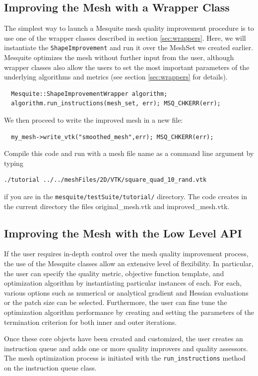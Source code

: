 \documentclass[letter]{report}
\begin{document}
\subsection{Improving the Mesh with a Wrapper Class}
\label{sec:tutWrapper}
The simplest way to launch a Mesquite mesh quality improvement procedure is to use one of the
wrapper classes described in section \ref{sec:wrappers}. Here, we will instantiate the
\texttt{ShapeImprovement} and run it over the MeshSet we created earlier. Mesquite
optimizes the mesh without further input from the user, although wrapper classes also allow the
users to set the most important parameters of the underlying algorithms and metrics (see section
\ref{sec:wrappers} for details).
\begin{verbatim}
  Mesquite::ShapeImprovementWrapper algorithm;
  algorithm.run_instructions(mesh_set, err); MSQ_CHKERR(err);
\end{verbatim}
We then proceed to write the improved mesh in a new file:
\begin{verbatim}
  my_mesh->write_vtk("smoothed_mesh",err); MSQ_CHKERR(err);
\end{verbatim}
Compile this code and run with a mesh file name as a command line argument by 
typing 
\begin{verbatim}
./tutorial ../../meshFiles/2D/VTK/square_quad_10_rand.vtk
\end{verbatim}
if you are in the \texttt{mesquite/testSuite/tutorial/} directory.
The code creates in the current directory the files original\_mesh.vtk
and improved\_mesh.vtk. 

\subsection{Improving the Mesh with the Low Level API}
\label{sec:tutDetailedAPI}
If the user requires in-depth control over the mesh quality improvement
process, the use of the Mesquite classes allow an extensive
level of flexibility.   In particular, the user can specify the quality
metric, objective function template, and optimization algorithm by
instantiating particular instances of each.  For each, various options
such as numerical or analytical gradient and Hessian evaluations or
the patch size can be selected.  Furthermore, the user can fine tune
the optimization algorithm performance by creating and setting the parameters 
of the termination criterion for both inner and outer iterations.

Once these core objects have been created and customized, the user
creates an instruction queue and adds one or more quality improvers
and quality assessors.  The mesh optimization process is initiated
with the {\tt run\_instructions} method on the instruction queue
class.
\end{document}
